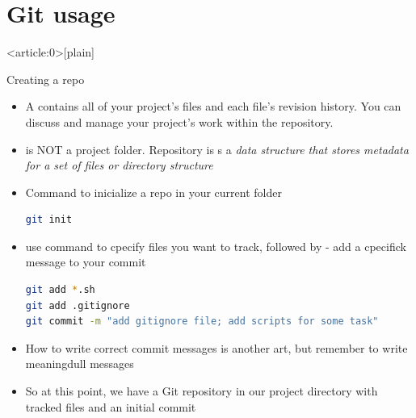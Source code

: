 \documentclass[usenames,dvipsnames,10pt,aspectratio=169]{beamer}
\begin{document}
\section{Git usage}
{ %
    \begin{frame}<article:0>[plain]
     \end{frame}
}

\begin{frame}[fragile]{Creating a repo}
    \begin{itemize}
        \item A  contains all of your project's files and each file's revision history. You can discuss and manage your project's work within the repository.
        \item {} is NOT a project folder. Repository is s a \textit{data structure that stores metadata for a set of files or directory structure}
        \item Command to inicialize a repo in your current folder
        \begin{lstlisting}[language=Bash, style=shellstyle] 
git init
\end{lstlisting}
        \item use  command to cpecify files you want to track, followed by  - add a cpecifick message to your commit
        \begin{lstlisting}[language=Bash, style=shellstyle] 
git add *.sh
git add .gitignore
git commit -m "add gitignore file; add scripts for some task" \end{lstlisting}
        \item How to write correct commit messages is another art, but remember to write meaningdull messages
        \item So at this point, we have a Git repository in our project directory with tracked files and an initial commit
    \end{itemize}
\end{frame}
\end{document}
